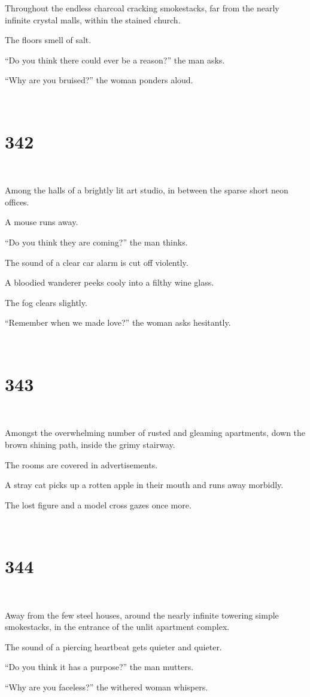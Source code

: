 \documentclass{report}
\begin{document}
Throughout the endless charcoal cracking smokestacks, far from the nearly infinite crystal malls, within the stained church.

The floors smell of salt.

``Do you think there could ever be a reason?'' the man asks.

``Why are you bruised?'' the woman ponders aloud.

~
\chapter*{342}
~

Among the halls of a brightly lit art studio, in between the sparse short neon offices.

A mouse runs away.

``Do you think they are coming?'' the man thinks.

The sound of a clear car alarm is cut off violently.

A bloodied wanderer peeks cooly into a filthy wine glass.

The fog clears slightly.

``Remember when we made love?'' the woman asks hesitantly.

~
\chapter*{343}
~

Amongst the overwhelming number of rusted and gleaming apartments, down the brown shining path, inside the grimy stairway.

The rooms are covered in advertisements.

A stray cat picks up a rotten apple in their mouth and runs away morbidly.

The lost figure and a model cross gazes once more.

~
\chapter*{344}
~

Away from the few steel houses, around the nearly infinite towering simple smokestacks, in the entrance of the unlit apartment complex.

The sound of a piercing heartbeat gets quieter and quieter.

``Do you think it has a purpose?'' the man mutters.

``Why are you faceless?'' the withered woman whispers.
\end{document}
